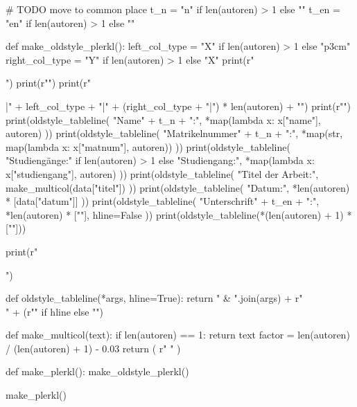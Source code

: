 \arrayrulewidth=0.5pt

\begin{pycode}

# TODO move to common place
t_n = "n" if len(autoren) > 1 else ""
t_en = "en" if len(autoren) > 1 else ""

def make_oldstyle_plerkl():
    left_col_type = "X" if len(autoren) > 1 else "p{3cm}"
    right_col_type = "Y" if len(autoren) > 1 else "X"
    print(r"\begin{table}[H] \centering")
    print(r"")
    print(r"\begin{tabularx}{\columnwidth}{|" + left_col_type + "|" + (right_col_type + "|") * len(autoren) + "}")
    print(r"\hline")
    print(oldstyle_tableline(
        "Name" + t_n + ":",
        *map(lambda x: x["name"], autoren)
    ))
    print(oldstyle_tableline(
        "Matrikelnummer" + t_n + ":",
        *map(str, map(lambda x: x["matnum"], autoren))
    ))
    print(oldstyle_tableline(
        "Studiengänge:" if len(autoren) > 1 else "Studiengang:",
        *map(lambda x: x["studiengang"], autoren)
    ))
    print(oldstyle_tableline(
        "Titel der Arbeit:",
        make_multicol(data["titel"])
    ))
    print(oldstyle_tableline(
        "Datum:",
        *len(autoren) * [data["datum"]]
	))
    print(oldstyle_tableline(
        "Unterschrift" + t_en + ":",
        *len(autoren) * [""],
        hline=False
    ))
    print(oldstyle_tableline(*(len(autoren) + 1) * [""]))

    print(r"\end{tabularx} \end{table}")

def oldstyle_tableline(*args, hline=True):
    return " & ".join(args) + r"\\" + (r"\hline" if hline else "")

def make_multicol(text):
    if len(autoren) == 1:
        return text
    factor = len(autoren) / (len(autoren) + 1) - 0.03
    return (
        r" "
    )

def make_plerkl():
    make_oldstyle_plerkl()

make_plerkl()
\end{pycode}
    


